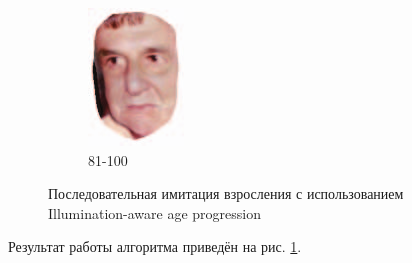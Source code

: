 \begin{figure}[t]
\begin{subfigure}[t]{0.2\textwidth}
		\includegraphics[width=\textwidth]{ilaware_cover7.png}
		\caption{81-100}
	\end{subfigure}
	\caption{Последовательная имитация взросления с использованием Illumination-aware age progression}
	\label{fig:ilaware}
\end{figure}

Результат работы алгоритма приведён на рис. \ref{fig:ilaware}.

